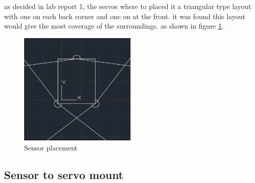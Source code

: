 as decided in lab report 1, the servos where to placed it a triangular type layout with one on each back corner and one on at the front. it was found this layout would give the most coverage of the surroundings. as shown in figure \ref{fig:sensor_placement}.

\begin{figure}[h]%
	\label{fig:sensor_placement}
	\begin{center}
	\includegraphics[width = 0.5\textwidth]{"assets/sensorplaceAservo"}
	\caption{Sensor placement}
	\end{center}
\end{figure}   

\subsection{Sensor to servo mount}

